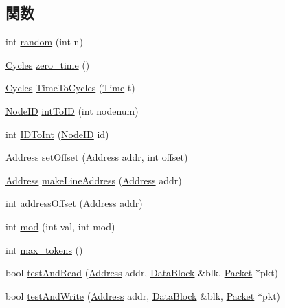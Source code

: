 \subsection*{関数}
\begin{DoxyCompactItemize}
\item 
int \hyperlink{RubySlicc__Util_8hh_a054fe6e7aa3343d6fee7974f712d356f}{random} (int n)
\item 
\hyperlink{classCycles}{Cycles} \hyperlink{RubySlicc__Util_8hh_ab26322bfb1b54466aa64f4004331c8a4}{zero\_\-time} ()
\item 
\hyperlink{classCycles}{Cycles} \hyperlink{RubySlicc__Util_8hh_a66423efa415e5d2f9721444631d64b1d}{TimeToCycles} (\hyperlink{classTime}{Time} t)
\item 
\hyperlink{TypeDefines_8hh_a83c14b4ae37e80071f6b3506a6c46151}{NodeID} \hyperlink{RubySlicc__Util_8hh_af871f54b5dfa4d06d5fa4bf151073079}{intToID} (int nodenum)
\item 
int \hyperlink{RubySlicc__Util_8hh_a4c6867d6bf98689723bdaa91c9c5e1ab}{IDToInt} (\hyperlink{TypeDefines_8hh_a83c14b4ae37e80071f6b3506a6c46151}{NodeID} id)
\item 
\hyperlink{classAddress}{Address} \hyperlink{RubySlicc__Util_8hh_aefc491106ae51d13fd4de1da69584186}{setOffset} (\hyperlink{classAddress}{Address} addr, int offset)
\item 
\hyperlink{classAddress}{Address} \hyperlink{RubySlicc__Util_8hh_a34d8ac0b1033cd01b3c076a556e599ba}{makeLineAddress} (\hyperlink{classAddress}{Address} addr)
\item 
int \hyperlink{RubySlicc__Util_8hh_a23322cb58f9528f114aa3bc1c85377bf}{addressOffset} (\hyperlink{classAddress}{Address} addr)
\item 
int \hyperlink{RubySlicc__Util_8hh_a1ae500ce573418f748bb5c85167c3bfb}{mod} (int val, int mod)
\item 
int \hyperlink{RubySlicc__Util_8hh_a1998a5b4fa544ddc060d14af78eb6f0b}{max\_\-tokens} ()
\item 
bool \hyperlink{RubySlicc__Util_8hh_a2d64f5e793ff434a195baa19092fdc7c}{testAndRead} (\hyperlink{classAddress}{Address} addr, \hyperlink{classDataBlock}{DataBlock} \&blk, \hyperlink{classPacket}{Packet} $\ast$pkt)
\item 
bool \hyperlink{RubySlicc__Util_8hh_afb1f6e13327ac7be7fc8f3886453bba0}{testAndWrite} (\hyperlink{classAddress}{Address} addr, \hyperlink{classDataBlock}{DataBlock} \&blk, \hyperlink{classPacket}{Packet} $\ast$pkt)
\end{DoxyCompactItemize}


